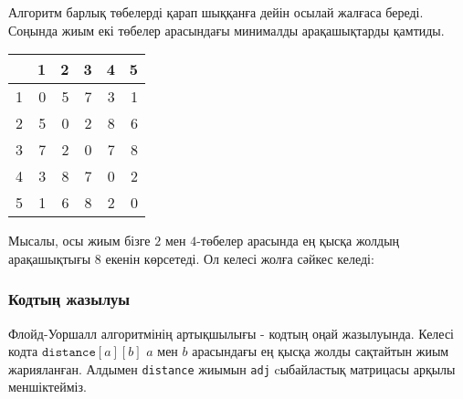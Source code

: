 Алгоритм барлық төбелерді қарап шыққанға дейін
осылай жалғаса береді. Соңында жиым екі төбелер
арасындағы минималды арақашықтарды қамтиды.

\begin{center}
\begin{tabular}{r|rrrrr}
 & 1 & 2 & 3 & 4 & 5 \\
\hline
1 & 0 & 5 & 7 & 3 & 1 \\
2 & 5 & 0 & 2 & 8 & 6 \\
3 & 7 & 2 & 0 & 7 & 8 \\
4 & 3 & 8 & 7 & 0 & 2 \\
5 & 1 & 6 & 8 & 2 & 0 \\
\end{tabular}
\end{center}

Мысалы, осы жиым бізге $2$ мен $4$-төбелер
арасында ең қысқа жолдың арақашықтығы $8$ екенін
көрсетеді.
Ол келесі жолға сәйкес келеді:

\begin{center}
\end{center}

\subsubsection{Кодтың жазылуы}


Флойд-Уоршалл алгоритмінің артықшылығы - кодтың оңай жазылуында.
Келесі кодта $\texttt{distance}[a][b]$ $a$ мен $b$ арасындағы
ең қысқа жолды сақтайтын жиым жарияланған.
Алдымен \texttt{distance} жиымын \texttt{adj} cыбайластық матрицасы
арқылы меншіктейміз.

